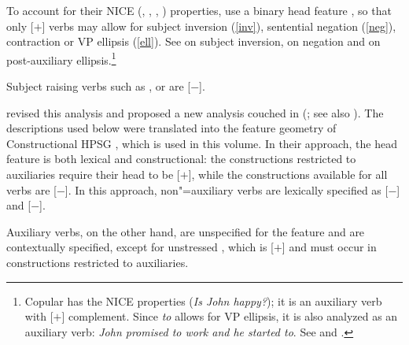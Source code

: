 To account for their NICE (, , , ) properties, \citet{KS2002a} %
use a binary head feature \aux, so that only [\aux $+$] verbs may allow for subject inversion
(\ref{inv}), sentential negation (\ref{neg}), contraction or VP ellipsis (\ref{ell}). See
 on subject inversion,
 on negation and
 on post-auxiliary ellipsis.\footnote{Copular  has
  the NICE properties (\textit{Is John happy?}); it is an auxiliary verb with [\prd $+$]
  complement. Since \emph{to} allows for VP ellipsis, it is also analyzed as an auxiliary verb:
  \emph{John promised to work and he started to}. See  and .} 

\eal
{}
\zl

\noindent
Subject raising verbs such as ,  or  are [\aux $-$].

\citet{Sagetal2020} revised this analysis and proposed a new analysis couched in \sbcg (\citealp{Sag2012a}; see also ). The descriptions used below were translated into the feature geometry of Constructional HPSG \citep{Sag97a}, which is used in this volume. In their approach, the head feature \aux is both lexical and constructional: the constructions restricted to auxiliaries require their head to be [\aux $+$], while the constructions available for all verbs are [\aux $-$]. In this approach, non"=auxiliary verbs are lexically specified as [\aux $-$] and [\inv $-$].


 Auxiliary verbs, on the other hand, are unspecified for the feature \aux and are contextually specified, except for unstressed , which is [\aux $+$] and must occur in constructions restricted to auxiliaries.

